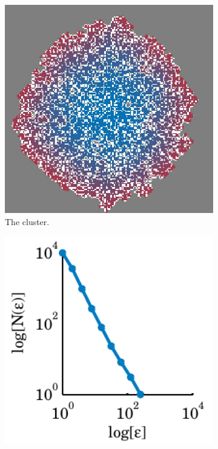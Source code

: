 \begin{figure}
	\centering
	\begin{subfigure}[t]{0.3\textwidth}
		\centering
		\includegraphics[width=1\textwidth]{./img/assignment_fractal_cluster}
		\caption{The cluster.}
		\label{fig:exp_fractal:cluster}
	\end{subfigure}
	\begin{subfigure}[t]{0.3\textwidth}
		\centering
		\includegraphics[width=1\textwidth]{./img/assignment_fractal_numboxesVSboxsize}

\end{subfigure}
\end{figure}
